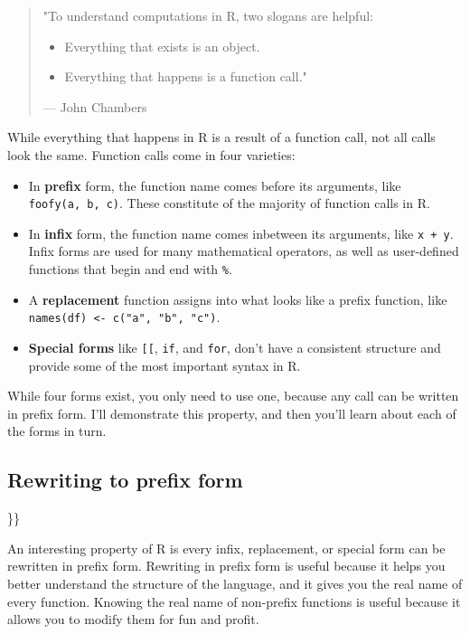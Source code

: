 \documentclass[]{book}
\providecommand{\tightlist}{%
  \setlength{\itemsep}{0pt}\setlength{\parskip}{0pt}}
\theoremstyle{definition}
\theoremstyle{definition}
\theoremstyle{definition}
\theoremstyle{remark}
\begin{document}
\begin{quote}
"To understand computations in R, two slogans are helpful:

\begin{itemize}
\tightlist
\item
  Everything that exists is an object.
\item
  Everything that happens is a function call."
\end{itemize}

--- John Chambers
\end{quote}

While everything that happens in R is a result of a function call, not
all calls look the same. Function calls come in four varieties:

\begin{itemize}
\item
  In \textbf{prefix} form, the function name comes before its arguments,
  like \texttt{foofy(a,\ b,\ c)}. These constitute of the majority of
  function calls in R.
\item
  In \textbf{infix} form, the function name comes inbetween its
  arguments, like \texttt{x\ +\ y}. Infix forms are used for many
  mathematical operators, as well as user-defined functions that begin
  and end with \texttt{\%}.
\item
  A \textbf{replacement} function assigns into what looks like a prefix
  function, like \texttt{names(df)\ \textless{}-\ c("a",\ "b",\ "c")}.
\item
  \textbf{Special forms} like \texttt{{[}{[}}, \texttt{if}, and
  \texttt{for}, don't have a consistent structure and provide some of
  the most important syntax in R.
\end{itemize}

While four forms exist, you only need to use one, because any call can
be written in prefix form. I'll demonstrate this property, and then
you'll learn about each of the forms in turn.

\hypertarget{rewriting-to-prefix-form}{%
\subsection{Rewriting to prefix form}\label{rewriting-to-prefix-form}}

\}\}

An interesting property of R is every infix, replacement, or special
form can be rewritten in prefix form. Rewriting in prefix form is useful
because it helps you better understand the structure of the language,
and it gives you the real name of every function. Knowing the real name
of non-prefix functions is useful because it allows you to modify them
for fun and profit.
\end{document}
